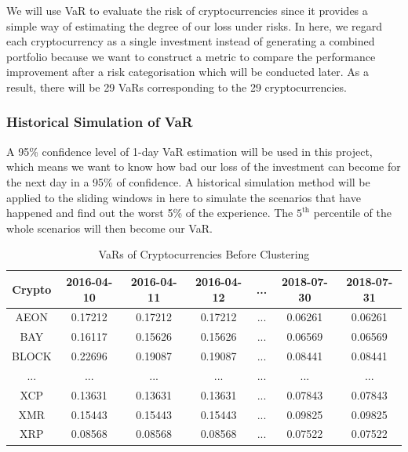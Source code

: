 \documentclass[11pt]{article} %
\theoremstyle{plain}
\theoremstyle{definition}
\begin{document}
We will use VaR to evaluate the risk of cryptocurrencies since it provides a simple way of estimating the degree of our loss under risks. In here, we regard each cryptocurrency as a single investment instead of generating a combined portfolio because we want to construct a metric to compare the performance improvement after a risk categorisation which will be conducted later. As a result, there will be 29 VaRs corresponding to the 29 cryptocurrencies.

\subsubsection{Historical Simulation of VaR}

A 95\% confidence level of 1-day VaR estimation will be used in this project, which means we want to know how bad our loss of the investment can become for the next day in a 95\% of confidence. A historical simulation method will be applied to the sliding windows in here to simulate the scenarios that have happened and find out the worst 5\% of the experience. The $5^{\mathrm{th}}$ percentile of the whole scenarios will then become our VaR.

{
  \begin{table}[ht]
    \centering
    \small
    \begin{tabular}{|c|c c c c c c|}
        \hline
        Crypto & 2016-04-10 & 2016-04-11 & 2016-04-12 & ... & 2018-07-30 & 2018-07-31 \\ [0.5ex]
        \hline
        AEON & 0.17212 & 0.17212 & 0.17212 & ... & 0.06261 & 0.06261 \\
        \hline
        BAY & 0.16117 & 0.15626 & 0.15626 & ... & 0.06569 & 0.06569 \\
        \hline
        BLOCK & 0.22696 & 0.19087 & 0.19087 & ... & 0.08441 & 0.08441 \\
        \hline
        ... & ... & ... & ... & ... & ... & ... \\
        \hline
        XCP & 0.13631 & 0.13631 & 0.13631 & ... & 0.07843 & 0.07843 \\
        \hline
        XMR & 0.15443 & 0.15443 & 0.15443 & ... & 0.09825 & 0.09825 \\
        \hline
        XRP & 0.08568 & 0.08568 & 0.08568 & ... & 0.07522 & 0.07522 \\
        \hline
    \end{tabular}
    \caption{VaRs of Cryptocurrencies Before Clustering}
    \label{table:varcryptobefore}
  \end{table}
}
\end{document}
